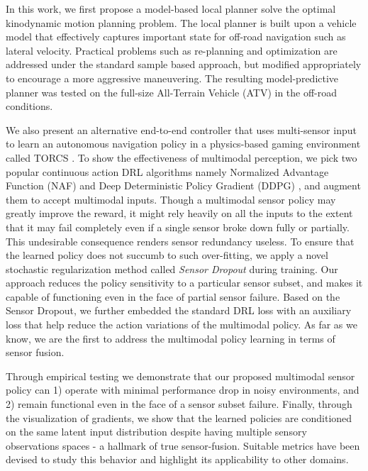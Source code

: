 \documentclass[../thesis.tex]{subfiles}
\begin{document}
In this work, we first propose a model-based local planner solve the optimal kinodynamic motion planning problem. 
The local planner is built upon a vehicle model that effectively captures important state for off-road navigation such as lateral velocity. 
Practical problems such as re-planning and optimization are addressed under the standard sample based approach, but modified appropriately to encourage a more aggressive maneuvering. 
The resulting model-predictive planner was tested on the full-size All-Terrain Vehicle (ATV) in the off-road conditions.
 
We also present an alternative end-to-end controller that uses multi-sensor input to learn an autonomous navigation policy in a physics-based gaming environment called TORCS \cite{wymann2000torcs}. 
To show the effectiveness of multimodal perception, we pick two popular continuous action DRL algorithms namely Normalized Advantage Function (NAF) \cite{CDQN} and Deep Deterministic Policy Gradient (DDPG) \cite{DBLP:journals/corr/LillicrapHPHETS15}, and augment them to accept multimodal inputs. 
Though a multimodal sensor policy may greatly improve the reward, it might rely heavily on all the inputs to the extent that it may fail completely even if a single sensor broke down fully or partially. This undesirable consequence renders sensor redundancy useless. 
To ensure that the learned policy does not succumb to such over-fitting, we apply a novel stochastic regularization method called \emph{Sensor Dropout} during training. 
Our approach reduces the policy sensitivity to a particular sensor subset, and makes it capable of functioning even in the face of partial sensor failure. 
Based on the Sensor Dropout, we further embedded the standard DRL loss with an auxiliary loss that help reduce the action variations of the multimodal policy. 
As far as we know, we are the first to address the multimodal policy learning in terms of sensor fusion.
 
Through empirical testing we demonstrate that our proposed multimodal sensor policy can 1) operate with minimal performance drop in noisy environments, and 2) remain functional even in the face of a sensor subset failure. 
Finally, through the visualization of gradients, we show that the learned policies are conditioned on the same latent input distribution despite having multiple sensory observations spaces - a hallmark of true sensor-fusion.
Suitable metrics have been devised to study this behavior and highlight its applicability to other domains.
 
\end{document}
